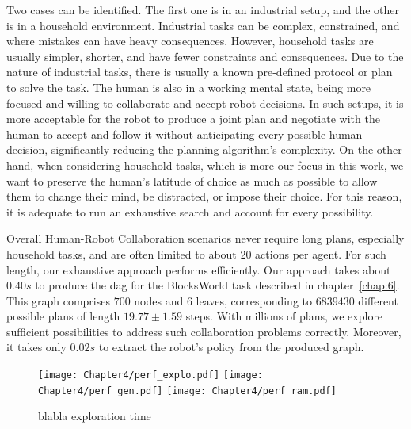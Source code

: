 Two cases can be identified. The first one is in an industrial setup, and the other is in a household environment. Industrial tasks can be complex, constrained, and where mistakes can have heavy consequences. However, household tasks are usually simpler, shorter, and have fewer constraints and consequences. Due to the nature of industrial tasks, there is usually a known pre-defined protocol or plan to solve the task. The human is also in a working mental state, being more focused and willing to collaborate and accept robot decisions. In such setups, it is more acceptable for the robot to produce a joint plan and negotiate with the human to accept and follow it without anticipating every possible human decision, significantly reducing the planning algorithm's complexity.
On the other hand, when considering household tasks, which is more our focus in this work, we want to preserve the human's latitude of choice as much as possible to allow them to change their mind, be distracted, or impose their choice. For this reason, it is adequate to run an exhaustive search and account for every possibility. 

Overall Human-Robot Collaboration scenarios never require long plans, especially household tasks, and are often limited to about 20 actions per agent. For such length, our exhaustive approach performs efficiently. Our approach takes about $0.40s$ to produce the \acrshort{dag} for the BlocksWorld task described in chapter~\ref{chap:6}. This graph comprises $700$ nodes and $6$ leaves, corresponding to $6839430$ different possible plans of length $19.77 \pm 1.59$ steps. With millions of plans, we explore sufficient possibilities to address such collaboration problems correctly. Moreover, it takes only $0.02s$ to extract the robot's policy from the produced graph. 


\begin{figure}
    \center
    \texttt{[image: Chapter4/perf\_explo.pdf]}
    \texttt{[image: Chapter4/perf\_gen.pdf]}
    \texttt{[image: Chapter4/perf\_ram.pdf]}
    \caption{blabla exploration time}
    \label{fig:performances}
\end{figure}

